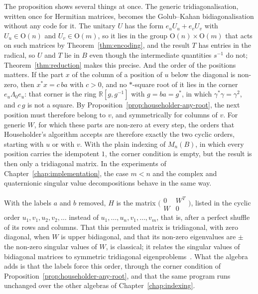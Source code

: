 \documentclass[12pt, a4paper]{report}
\theoremstyle{plain}
\theoremstyle{definition}
\theoremstyle{remark}
\theoremstyle{plain}
\newcommand{\RR}{\mathbb{R}}
\newcommand{\Or}{\mathrm{O}}
\begin{document}
The proposition shows several things at once. The generic tridiagonalisation, written once for Hermitian matrices, becomes the Golub--Kahan bidiagonalisation without any code for it. The unitary $U$ has the form $e_uU_u+e_vU_v$ with $U_u\in\Or(n)$ and $U_v\in\Or(m)$, so it lies in the group $\Or(n)\times\Or(m)$ that acts on such matrices by Theorem~\ref{thm:encoding}, and the result $T$ has entries in the radical, so $U$ and $T$ lie in $B$ even though the intermediate quantities $s^{-1}$ do not; Theorem~\ref{thm:reduction} makes this precise. And the order of the positions matters. If the part $x$ of the column of a position of $u$ below the diagonal is non-zero, then $x^*x=c\,ba$ with $c>0$, and no $*$-square root of it lies in the corner $e_u\Lambda_0e_u$: that corner is the ring $\RR[g,g^{-1}]$ with $g=ba=g^*$, in which $\gamma^*\gamma=\gamma^2$, and $c\,g$ is not a square. By Proposition~\ref{prop:householder-any-root}, the next position must therefore belong to $v$, and symmetrically for columns of $v$. For generic $W$, for which these parts are non-zero at every step, the orders that Householder's algorithm accepts are therefore exactly the two cyclic orders, starting with $u$ or with $v$. With the plain indexing of $M_n(B)$, in which every position carries the idempotent $1$, the corner condition is empty, but the result is then only a tridiagonal matrix. In the experiments of Chapter~\ref{chap:implementation}, the case $m<n$ and the complex and quaternionic singular value decompositions behave in the same way.

With the labels $a$ and $b$ removed, $H$ is the matrix $\bigl(\begin{smallmatrix}0&W^T\\W&0\end{smallmatrix}\bigr)$, listed in the cyclic order $u_1,v_1,u_2,v_2,\dots$ instead of $u_1,\dots,u_n,v_1,\dots,v_m$, that is, after a perfect shuffle of its rows and columns. That this permuted matrix is tridiagonal, with zero diagonal, when $W$ is upper bidiagonal, and that its non-zero eigenvalues are $\pm$ the non-zero singular values of $W$, is classical; it relates the singular values of bidiagonal matrices to symmetric tridiagonal eigenproblems~\cite{GolubKahan1965,DemmelKahan1990}. What the algebra adds is that the labels force this order, through the corner condition of Proposition~\ref{prop:householder-any-root}, and that the same program runs unchanged over the other algebras of Chapter~\ref{chap:indexing}.
\end{document}
